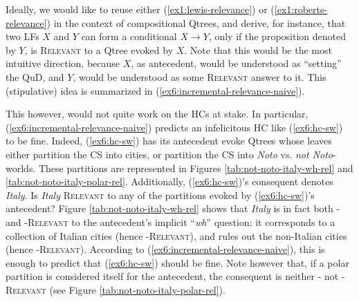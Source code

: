 Ideally, we would like to reuse either (\ref{ex1:lewis-relevance}) or (\ref{ex1:roberts-relevance}) in the context of compositional Qtrees, and derive, for instance, that two LFs $X$ and $Y$ can form a conditional $X \rightarrow Y$, only if the proposition denoted by $Y$, is \textsc{Relevant} to a Qtree evoked by $X$. Note that this would be the most intuitive direction, because $X$, as antecedent, would be understood as ``setting'' the QuD, and $Y$, would be understood as some \textsc{Relevant} answer to it. This (stipulative) idea is summarized in (\ref{ex6:incremental-relevance-naive}).

\begin{exe}
	\label{ex6:incremental-relevance-naive}
\end{exe}

This however, would not quite work on the HCs at stake. In particular, (\ref{ex6:incremental-relevance-naive}) predicts an infelicitous HC like (\ref{ex6:hc-sw}) to be fine. Indeed, (\ref{ex6:hc-sw}) has its antecedent evoke Qtrees whose leaves either partition the CS into cities, or partition the CS into \textit{Noto} vs. \textit{not Noto}-worlds. These partitions are represented in Figures \ref{tab:not-noto-italy-wh-rel} and \ref{tab:not-noto-italy-polar-rel}. Additionally, (\ref{ex6:hc-sw})'s consequent denotes \textit{Italy}. Is \textit{Italy} \textsc{Relevant} to any of the partitions evoked by (\ref{ex6:hc-sw})'s antecedent? Figure \ref{tab:not-noto-italy-wh-rel} shows that \textit{Italy} is in fact both \textsc{\citeauthor*{Lewis1988}-} and \textsc{\citeauthor{Roberts2012}-Relevant} to the antecedent's implicit ``\textit{wh}'' question: it corresponds to a collection of Italian cities (hence \textsc{\citeauthor*{Lewis1988}-Relevant}), and rules out the non-Italian cities (hence \textsc{\citeauthor{Roberts2012}-Relevant}). According to (\ref{ex6:incremental-relevance-naive}), this is enough to predict that (\ref{ex6:hc-sw}) should be fine. Note however that, if a polar partition is considered itself for the antecedent, the consequent is neither \textsc{\citeauthor*{Lewis1988}-} not \textsc{\citeauthor{Roberts2012}-Relevant} (see Figure \ref{tab:not-noto-italy-polar-rel}).

